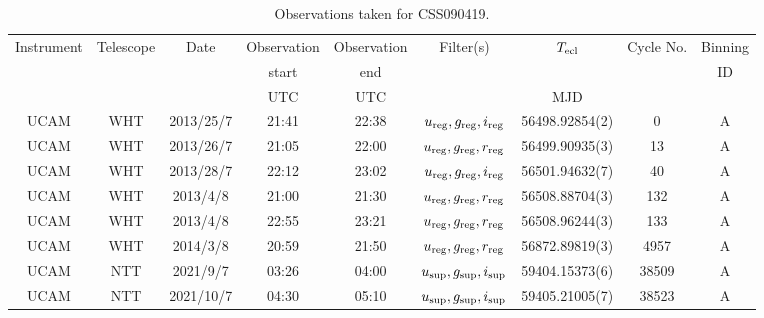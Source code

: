 \begin{table}
	\begin{center}
		\caption{Observations taken for CSS090419.}
		\label{table:observing:observation logs CSS090419}
		\begin{tabular}{ccccccccc}
			\hline
			Instrument & Telescope & Date & Observation  & Observation  & Filter(s) & $T_{\rm ecl}$ & Cycle No. & Binning \\
			 &  &  &  start &  end &  &  &  & ID \\
			 &  &  & UTC & UTC &  & MJD &  &  \\
			\hline
			\hline
			UCAM & WHT & 2013/25/7 & 21:41 & 22:38 & $u_{\rm reg},g_{\rm reg},i_{\rm reg}$ & 56498.92854(2) &    0  & A \\
			UCAM & WHT & 2013/26/7 & 21:05 & 22:00 & $u_{\rm reg},g_{\rm reg},r_{\rm reg}$ & 56499.90935(3) &   13  & A \\
			UCAM & WHT & 2013/28/7 & 22:12 & 23:02 & $u_{\rm reg},g_{\rm reg},i_{\rm reg}$ & 56501.94632(7) &   40  & A \\
			UCAM & WHT & 2013/4/8  & 21:00 & 21:30 & $u_{\rm reg},g_{\rm reg},r_{\rm reg}$ & 56508.88704(3) &  132  & A \\
			UCAM & WHT & 2013/4/8  & 22:55 & 23:21 & $u_{\rm reg},g_{\rm reg},r_{\rm reg}$ & 56508.96244(3) &  133  & A \\
			UCAM & WHT & 2014/3/8  & 20:59 & 21:50 & $u_{\rm reg},g_{\rm reg},r_{\rm reg}$ & 56872.89819(3) & 4957  & A \\
			UCAM & NTT & 2021/9/7  & 03:26 & 04:00 & $u_{\rm sup},g_{\rm sup},i_{\rm sup}$ & 59404.15373(6) & 38509 & A \\
			UCAM & NTT & 2021/10/7 & 04:30 & 05:10 & $u_{\rm sup},g_{\rm sup},i_{\rm sup}$ & 59405.21005(7) & 38523 & A \\
		   \hline
		\end{tabular}
	\end{center}
\end{table}
